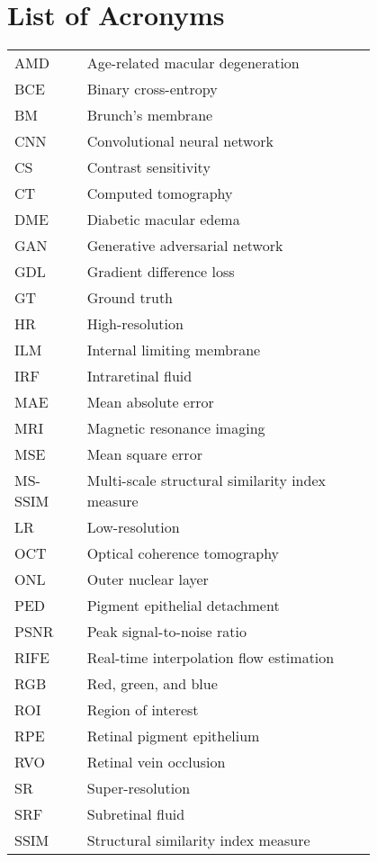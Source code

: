 \chapter*{List of Acronyms}

\begin{flushleft}
\begin{tabular}{l p{0.8\linewidth}}
	
AMD      & Age-related macular degeneration\\
BCE		 & Binary cross-entropy\\
BM   	 & Brunch's membrane\\
CNN      & Convolutional neural network\\
CS 		 & Contrast sensitivity\\
CT 		 & Computed tomography\\
DME      & Diabetic macular edema\\
GAN 	 & Generative adversarial network\\
GDL 	 & Gradient difference loss\\
GT  	 & Ground truth\\
HR 		 & High-resolution\\
ILM 	 & Internal limiting membrane\\
IRF      & Intraretinal fluid\\
MAE 	 & Mean absolute error\\
MRI 	 & Magnetic resonance imaging\\
MSE		 & Mean square error\\	
MS-SSIM  & Multi-scale structural similarity index measure\\
LR 		 & Low-resolution\\
OCT      & Optical coherence tomography\\
ONL      & Outer nuclear layer\\
PED      & Pigment epithelial detachment\\
PSNR 	 & Peak signal-to-noise ratio\\
RIFE	 & Real-time interpolation flow estimation\\
RGB 	 & Red, green, and blue\\
ROI		 & Region of interest\\
RPE      & Retinal pigment epithelium\\
RVO 	 & Retinal vein occlusion\\
SR		 & Super-resolution\\
SRF      & Subretinal fluid\\
SSIM 	 & Structural similarity index measure\\

\end{tabular}
\end{flushleft}

